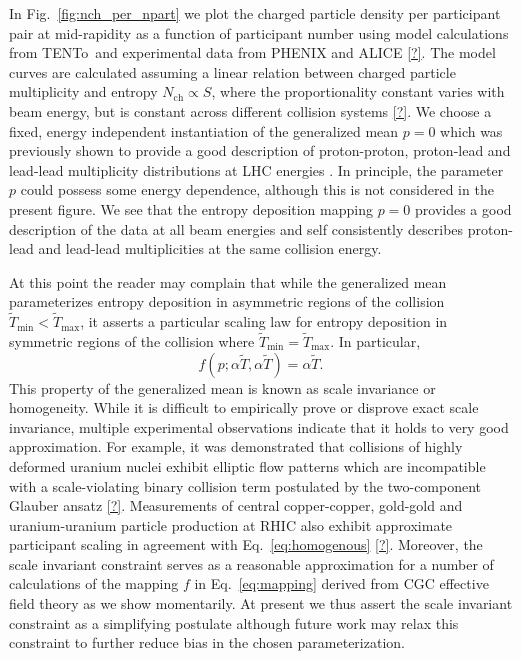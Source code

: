 \documentclass[aps,prc,reprint,amsmath,nofootinbib,superscriptaddress]{revtex4-1}
\newcommand{\trento}{T\raisebox{-0.5ex}{R}ENTo}
\newcommand{\nch}{N_\text{ch}}
\newcommand{\T}{\tilde{T}}
\begin{document}
In Fig.~\ref{fig:nch_per_npart} we plot the charged particle density per participant pair at mid-rapidity as a function of participant number using model calculations from \trento\ and experimental data from PHENIX and ALICE \ref{?}.
The model curves are calculated assuming a linear relation between charged particle multiplicity and entropy $\nch \propto S$, where the proportionality constant varies with beam energy, but is constant across different collision systems \ref{?}.
We choose a fixed, energy independent instantiation of the generalized mean $p=0$ which was previously shown to provide a good description of proton-proton, proton-lead and lead-lead multiplicity distributions at LHC energies \cite{Moreland:2014oya}. In principle, the parameter $p$ could possess some energy dependence, although this is not considered in the present figure.
We see that the entropy deposition mapping $p=0$ provides a good description of the data at all beam energies and self consistently describes proton-lead and lead-lead multiplicities at the same collision energy.

At this point the reader may complain that while the generalized mean parameterizes entropy deposition in asymmetric regions of the collision $\T_\text{min} < \T_\text{max}$, it asserts a particular scaling law for entropy deposition in symmetric regions of the collision where $\T_\text{min} = \T_\text{max}$.
In particular,
\begin{equation}
  f(p; \alpha \T, \alpha \T) = \alpha \T.
  \label{eq:homogenous}
\end{equation}
This property of the generalized mean is known as scale invariance or homogeneity.
While it is difficult to empirically prove or disprove exact scale invariance, multiple experimental observations indicate that it holds to very good approximation.
For example, it was demonstrated that collisions of highly deformed uranium nuclei exhibit elliptic flow patterns which are incompatible with a scale-violating binary collision term postulated by the two-component Glauber ansatz \ref{?}.
Measurements of central copper-copper, gold-gold and uranium-uranium particle production at RHIC also exhibit approximate participant scaling in agreement with Eq.~\eqref{eq:homogenous} \ref{?}.
Moreover, the scale invariant constraint serves as a reasonable approximation for a number of calculations of the mapping $f$ in Eq.~\eqref{eq:mapping} derived from CGC effective field theory as we show momentarily.
At present we thus assert the scale invariant constraint as a simplifying postulate although future work may relax this constraint to further reduce bias in the chosen parameterization.
\end{document}
